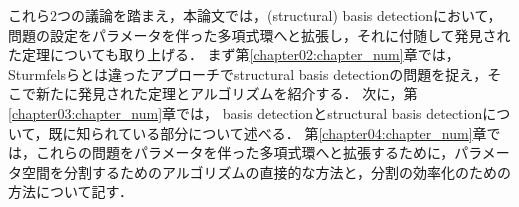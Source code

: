 \par
これら$2$つの議論を踏まえ，本論文では，(structural) \groebner{} basis detectionにおいて，問題の設定をパラメータを伴った多項式環へと拡張し，それに付随して発見された定理についても取り上げる．
まず第\ref{chapter02:chapter_num}章では，Sturmfelsらとは違ったアプローチでstructural \groebner{} basis detectionの問題を捉え，そこで新たに発見された定理とアルゴリズムを紹介する．
次に，第\ref{chapter03:chapter_num}章では，\groebner{} basis detectionとstructural \groebner{} basis detectionについて，既に知られている部分について述べる．
第\ref{chapter04:chapter_num}章では，これらの問題をパラメータを伴った多項式環へと拡張するために，パラメータ空間を分割するためのアルゴリズムの直接的な方法と，分割の効率化のための方法について記す．